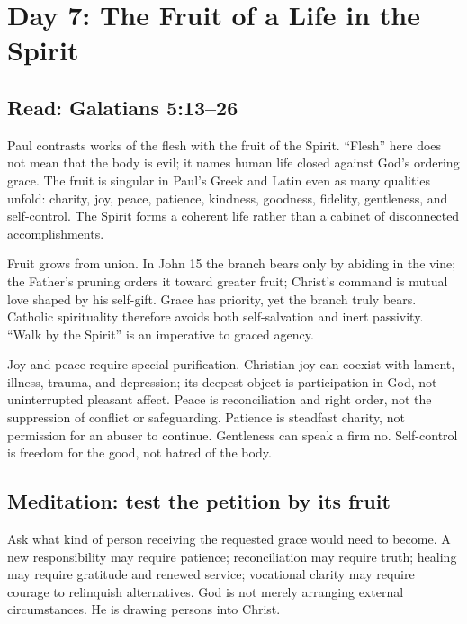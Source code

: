 \section{Day 7: The Fruit of a Life in the Spirit}


\subsection{Read: Galatians 5:13--26}

Paul contrasts works of the flesh with the fruit of the Spirit. “Flesh” here does not mean that the body is evil; it names human life closed against God's ordering grace. The fruit is singular in Paul's Greek and Latin even as many qualities unfold: charity, joy, peace, patience, kindness, goodness, fidelity, gentleness, and self-control. The Spirit forms a coherent life rather than a cabinet of disconnected accomplishments.

Fruit grows from union. In John 15 the branch bears only by abiding in the vine; the Father's pruning orders it toward greater fruit; Christ's command is mutual love shaped by his self-gift. Grace has priority, yet the branch truly bears. Catholic spirituality therefore avoids both self-salvation and inert passivity. “Walk by the Spirit” is an imperative to graced agency.

Joy and peace require special purification. Christian joy can coexist with lament, illness, trauma, and depression; its deepest object is participation in God, not uninterrupted pleasant affect. Peace is reconciliation and right order, not the suppression of conflict or safeguarding. Patience is steadfast charity, not permission for an abuser to continue. Gentleness can speak a firm no. Self-control is freedom for the good, not hatred of the body.

\subsection{Meditation: test the petition by its fruit}

Ask what kind of person receiving the requested grace would need to become. A new responsibility may require patience; reconciliation may require truth; healing may require gratitude and renewed service; vocational clarity may require courage to relinquish alternatives. God is not merely arranging external circumstances. He is drawing persons into Christ.


